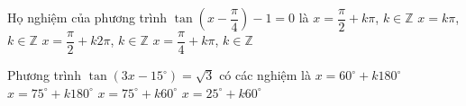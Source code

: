 \begin{ex}%
Họ nghiệm của phương trình $\tan \left( x-\dfrac{\pi}{4} \right)-1=0$ là
\choice
{\True $x=\dfrac{\pi}{2}+k\pi$, $k \in \mathbb{Z}$}
{$x=k\pi$, $k \in \mathbb{Z}$}
{$x=\dfrac{\pi}{2}+k2\pi$, $k \in \mathbb{Z}$}
{$x=\dfrac{\pi}{4}+k\pi$, $k \in \mathbb{Z}$}
\end{ex}

\begin{ex}%
Phương trình $\tan\left(3x-15^{\circ}\right)=\sqrt{3}$ có các nghiệm là
\choice
{$x=60^{\circ}+k180^{\circ}$}
{$x=75^{\circ}+k180^{\circ}$}
{$x=75^{\circ}+k60^{\circ}$}
{\True $x=25^{\circ}+k60^{\circ}$}
\end{ex}

